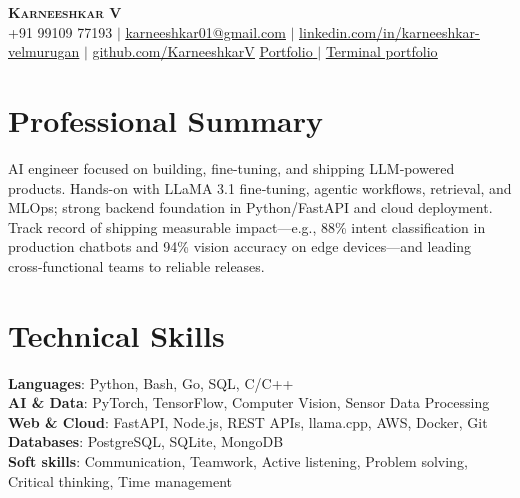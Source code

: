\documentclass[letterpaper,11pt]{article}
\begin{document}
\begin{center}
  \textbf{\Huge \scshape Karneeshkar V} \\ \vspace{1pt}
  \small +91 99109 77193 $|$ 
  \href{mailto:karneeshkar01@gmail.com}{\underline{karneeshkar01@gmail.com}} $|$
  \href{https://www.linkedin.com/in/karneeshkar-velmurugan/}{\underline{linkedin.com/in/karneeshkar-velmurugan}} $|$
  \href{https://github.com/KarneeshkarV}{\underline{github.com/KarneeshkarV}} 
\newline \newline
\href{https://karneeshkar.tech/}{\underline{Portfolio}  }$|$
\href{https://www.karneeshkar.tech/#terminal}{\underline{Terminal portfolio}}
\end{center}

\section{Professional Summary}
AI engineer focused on building, fine-tuning, and shipping LLM‑powered products. Hands-on with LLaMA 3.1 fine‑tuning, agentic workflows, retrieval, and MLOps; strong backend foundation in Python/FastAPI and cloud deployment. Track record of shipping measurable impact—e.g., 88\% intent classification in production chatbots and 94\% vision accuracy on edge devices—and leading cross‑functional teams to reliable releases.

\section{Technical Skills}
\begin{itemize}[leftmargin=0.15in, label={}]
  \small{\item{
    \textbf{Languages}{:  Python, Bash, Go, SQL, C/C++} \\
    \textbf{AI \& Data}{: PyTorch, TensorFlow, Computer Vision, Sensor Data Processing} \\
    \textbf{Web \& Cloud}{: FastAPI, Node.js, REST APIs, llama.cpp, AWS, Docker, Git} \\
    \textbf{Databases}{: PostgreSQL, SQLite, MongoDB}\\
              \textbf{Soft skills}{: Communication, Teamwork, Active listening, Problem solving, Critical thinking, Time management }}}
\end{itemize}
\end{document}
